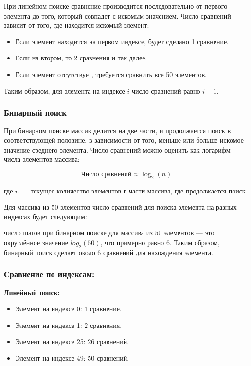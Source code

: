 \hspace{1.25cm}
При линейном поиске сравнение производится последовательно от первого элемента до того, который совпадет с искомым значением. Число сравнений зависит от того, где находится искомый элемент:

\begin{itemize}
    \item Если элемент находится на первом индексе, будет сделано 1 сравнение.
    \item Если на втором, то 2 сравнения и так далее.
    \item Если элемент отсутствует, требуется сравнить все 50 элементов.
\end{itemize}

Таким образом, для элемента на индексе \(i\) число сравнений равно \(i + 1\).

\subsubsection*{Бинарный поиск}

\hspace{1.25cm}
При бинарном поиске массив делится на две части, и продолжается поиск в соответствующей половине, в зависимости от того, меньше или больше искомое значение среднего элемента. Число сравнений можно оценить как логарифм числа элементов массива:

\begin{equation}
\text{Число сравнений} \approx \log_2(n)
\end{equation}

где \(n\) — текущее количество элементов в части массива, где продолжается поиск.

Для массива из 50 элементов число сравнений для поиска элемента на разных индексах будет следующим:

число шагов при бинарном поиске для массива из 50 элементов — это округлённое значение $log_2(50)$, что примерно равно 6. Таким образом, бинарный поиск сделает около 6 сравнений для нахождения элемента.

\subsubsection*{Сравнение по индексам:}

\textbf{Линейный поиск:}
\begin{itemize}
    \item Элемент на индексе 0: 1 сравнение.
    \item Элемент на индексе 1: 2 сравнения.
    \item Элемент на индексе 25: 26 сравнений.
    \item Элемент на индексе 49: 50 сравнений.
\end{itemize}

